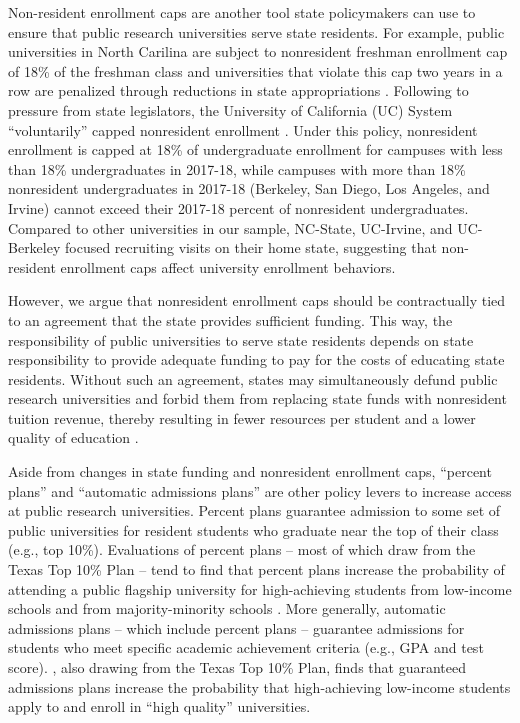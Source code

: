 \documentclass[twoside]{article}
\begin{document}
Non-resident enrollment caps are another tool state policymakers can use to ensure that public research universities serve state residents.  For example, public universities in North Carilina are subject to nonresident freshman enrollment cap of 18\% of the freshman class and universities that violate this cap two years in a row are penalized through reductions in state appropriations \citep{RN4424}. Following to pressure from state legislators, the  University of California (UC) System ``voluntarily'' capped nonresident enrollment \citep{RN4433}. Under this policy, nonresident enrollment is capped at 18\% of undergraduate enrollment for campuses with less than 18\% undergraduates in 2017-18, while campuses with more than 18\% nonresident undergraduates in 2017-18 (Berkeley, San Diego, Los Angeles, and Irvine) cannot exceed their 2017-18 percent of nonresident undergraduates.  Compared to other universities in our sample, NC-State, UC-Irvine, and UC-Berkeley focused recruiting visits on their home state, suggesting that non-resident enrollment caps affect university enrollment behaviors. 

However, we argue that nonresident enrollment caps should be contractually tied to an agreement that the state provides sufficient funding. This way, the responsibility of public universities to serve state residents depends on state responsibility to provide adequate funding to pay for the costs of educating state residents.  Without such an agreement, states may simultaneously defund public research universities and forbid them from replacing state funds with nonresident tuition revenue, thereby resulting in fewer resources per student and a lower quality of education \citep{RN532}.

Aside from changes in state funding and nonresident enrollment caps, ``percent plans'' and ``automatic admissions plans'' are other policy levers to increase access at public research universities.  Percent plans guarantee admission to some set of public universities for resident students who graduate near the top of their class (e.g., top 10\%).  Evaluations of percent plans -- most of which draw from the Texas Top 10\% Plan -- tend to find that percent plans increase the probability of attending a public flagship university for high-achieving students from low-income schools and from majority-minority schools \citep{RN4434,RN4435,RN4437,RN4436}.  More generally, automatic admissions plans -- which include percent plans -- guarantee admissions for students who meet specific academic achievement criteria (e.g., GPA and test score).  \cite{RN4428}, also drawing from the Texas Top 10\% Plan, finds that guaranteed admissions plans increase the probability that high-achieving low-income students apply to and enroll in ``high quality'' universities.
\end{document}
